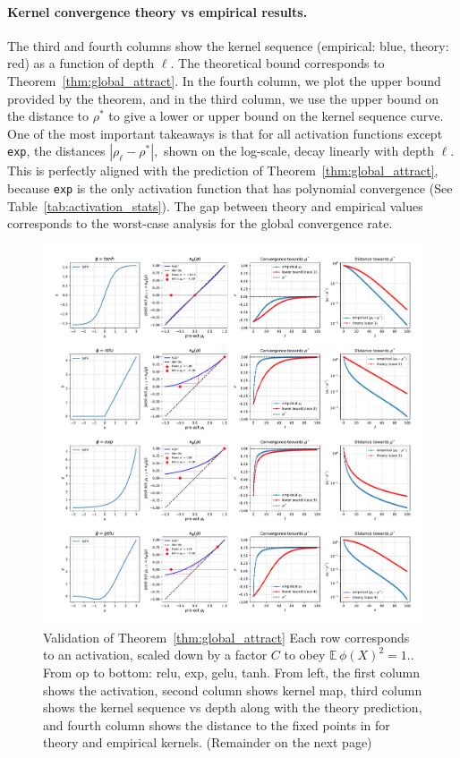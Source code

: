\documentclass[twoside]{article}
\newcommand{\E}{\mathbb{E}\,}
\theoremstyle{definition}
\begin{document}
\paragraph{Kernel convergence theory vs empirical results.}
The third and fourth columns show the kernel sequence (empirical: blue, theory: red) as a function of depth $\ell.$  The theoretical bound corresponds to Theorem~\ref{thm:global_attract}. In the fourth column, we plot the upper bound provided by the theorem, and in the third column, we use the upper bound on the distance to $\rho^*$ to give a lower or upper bound on the kernel sequence curve.  One of the most important takeaways is that for all activation functions except \texttt{exp}, the distances $|\rho_\ell-\rho^*|,$ shown on the log-scale, decay linearly with depth $\ell.$ This is perfectly aligned with the prediction of Theorem~\ref{thm:global_attract}, because \texttt{exp} is the only activation function that has polynomial convergence (See Table~\ref{tab:activation_stats}). The gap between theory and empirical values corresponds to the worst-case analysis for the global convergence rate. 


\begin{figure}[ht]
    \centering
    \includegraphics[width=\textwidth]{./kernel_convergence.pdf}
    \caption{\small Validation of Theorem~\ref{thm:global_attract} Each row corresponds to an activation, scaled down by a factor $C$ to obey $\E \phi(X)^2=1.$. From op to bottom: relu, exp, gelu, tanh. From left, the first column shows the activation, second column shows kernel map, third column shows the kernel sequence vs depth along with the theory prediction, and fourth column shows the distance to the fixed points in for theory and empirical kernels. (Remainder on the next page)}
    \label{fig:validation_plots}
\end{figure}
\end{document}
